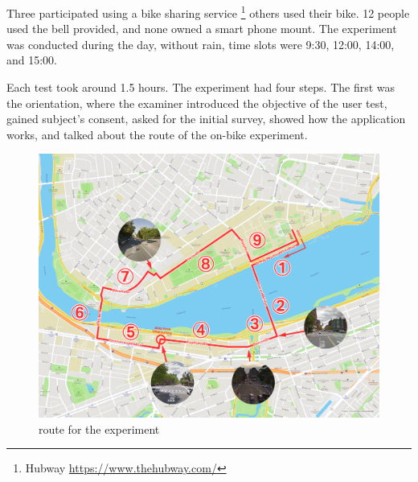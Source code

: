 Three participated using a bike sharing service 
\footnote{Hubway \url{https://www.thehubway.com/}}
others used their bike.
12 people used the bell provided, and none owned a smart phone mount. 
The experiment was conducted during the day, without rain, time slots were 9:30, 12:00, 14:00, and 15:00.

Each test took around 1.5 hours. The experiment had four steps.
The first was the orientation, where the examiner introduced the objective of the user test, gained subject's consent,
asked for the initial survey, showed how the application works, and talked about the route of the on-bike experiment.

\begin{figure}[htb]
  \includegraphics[width=1.0\textwidth]{chapters/4/fig/fixed_route.png}             
  \caption[fixed route map]{route for the experiment}
  \label{fig:route}
\end{figure}

